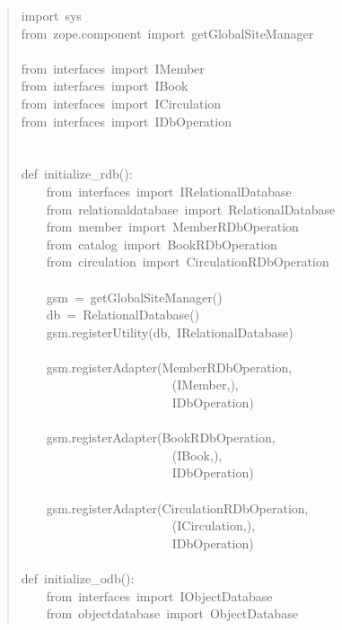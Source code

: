 \documentclass[a4paper,openany,twoside,final]{book}
\begin{document}
\begin{quote}{\ttfamily \raggedright \noindent
import~sys\\
from~zope.component~import~getGlobalSiteManager\\
~\\
from~interfaces~import~IMember\\
from~interfaces~import~IBook\\
from~interfaces~import~ICirculation\\
from~interfaces~import~IDbOperation\\
~\\
~\\
def~initialize\_rdb():\\
~~~~from~interfaces~import~IRelationalDatabase\\
~~~~from~relationaldatabase~import~RelationalDatabase\\
~~~~from~member~import~MemberRDbOperation\\
~~~~from~catalog~import~BookRDbOperation\\
~~~~from~circulation~import~CirculationRDbOperation\\
~\\
~~~~gsm~=~getGlobalSiteManager()\\
~~~~db~=~RelationalDatabase()\\
~~~~gsm.registerUtility(db,~IRelationalDatabase)\\
~\\
~~~~gsm.registerAdapter(MemberRDbOperation,\\
~~~~~~~~~~~~~~~~~~~~~~~~(IMember,),\\
~~~~~~~~~~~~~~~~~~~~~~~~IDbOperation)\\
~\\
~~~~gsm.registerAdapter(BookRDbOperation,\\
~~~~~~~~~~~~~~~~~~~~~~~~(IBook,),\\
~~~~~~~~~~~~~~~~~~~~~~~~IDbOperation)\\
~\\
~~~~gsm.registerAdapter(CirculationRDbOperation,\\
~~~~~~~~~~~~~~~~~~~~~~~~(ICirculation,),\\
~~~~~~~~~~~~~~~~~~~~~~~~IDbOperation)\\
~\\
def~initialize\_odb():\\
~~~~from~interfaces~import~IObjectDatabase\\
~~~~from~objectdatabase~import~ObjectDatabase\\
}
\end{quote}
\end{document}
